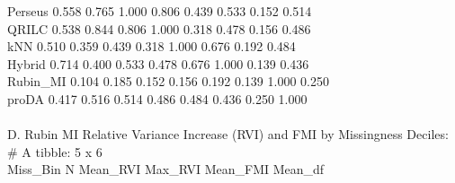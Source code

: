 \documentclass[11pt,oneside]{book}
\begin{document}
\begin{routput}
Perseus \hspace*{1.8em}0.558 \hspace*{0.8em}0.765 \hspace*{1.2em}1.000 0.806 0.439 \hspace*{1em}0.533 \hspace*{1.5em}0.152 0.514\\
QRILC \hspace*{2.5em}0.538 \hspace*{0.8em}0.844 \hspace*{1.2em}0.806 1.000 0.318 \hspace*{1em}0.478 \hspace*{1.5em}0.156 0.486\\
kNN \hspace*{3.5em}0.510 \hspace*{0.8em}0.359 \hspace*{1.2em}0.439 0.318 1.000 \hspace*{1em}0.676 \hspace*{1.5em}0.192 0.484\\
Hybrid \hspace*{2.5em}0.714 \hspace*{0.8em}0.400 \hspace*{1.2em}0.533 0.478 0.676 \hspace*{1em}1.000 \hspace*{1.5em}0.139 0.436\\
Rubin\_MI \hspace*{1.2em}0.104 \hspace*{0.8em}0.185 \hspace*{1.2em}0.152 0.156 0.192 \hspace*{1em}0.139 \hspace*{1.5em}1.000 0.250\\
proDA \hspace*{2.5em}0.417 \hspace*{0.8em}0.516 \hspace*{1.2em}0.514 0.486 0.484 \hspace*{1em}0.436 \hspace*{1.5em}0.250 1.000\\
\\
D. Rubin MI Relative Variance Increase (RVI) and FMI by Missingness Deciles:\\
\# A tibble: 5 x 6\\
\hspace*{1em}Miss\_Bin \hspace*{1.5em}N Mean\_RVI Max\_RVI Mean\_FMI Mean\_df\\

\end{routput}
\end{document}
